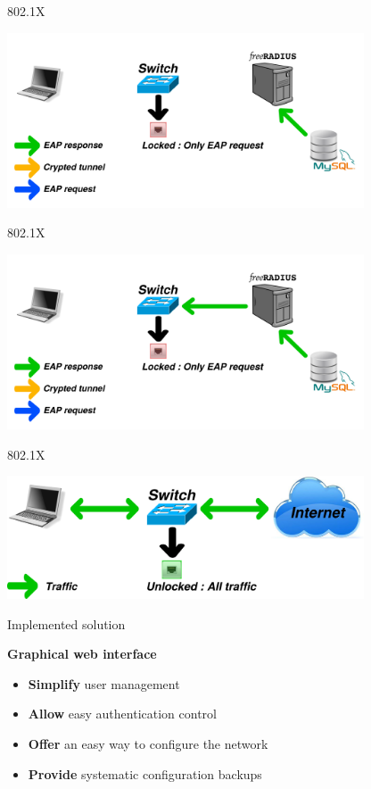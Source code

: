 \documentclass[12pt]{beamer}
\begin{document}
\begin{frame}{802.1X}
\vfill
\begin{center}
    \includegraphics[width=300pt]{img/dot1x_5.pdf}
\end{center}
\vfill
\end{frame}

\begin{frame}{802.1X}
\vfill
\begin{center}
    \includegraphics[width=300pt]{img/dot1x_6.pdf}
\end{center}
\vfill
\end{frame}

\begin{frame}{802.1X}
\vfill
\begin{center}
    \includegraphics[width=300pt]{img/dot1x_7.pdf}
\end{center}
\vfill
\end{frame}

\begin{frame}{Implemented solution}
    \begin{center}
    \textbf{Graphical web interface}
    \end{center}

    \pause
    \begin{itemize}[<+->]\vfill
	\item \textbf{Simplify} user management\vfill
	\item \textbf{Allow} easy authentication control\vfill
	\item \textbf{Offer} an easy way to configure the network\vfill
    	\item \textbf{Provide} systematic configuration backups\vfill
    \end{itemize}
    \vfill
\end{frame}
	
\end{document}
